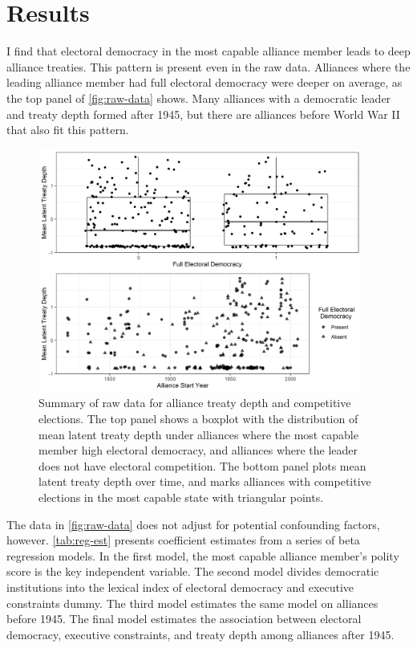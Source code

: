 \documentclass[12pt]{article}
\begin{document}
\section{Results}


I find that electoral democracy in the most capable alliance member leads to deep alliance treaties. 
This pattern is present even in the raw data. 
Alliances where the leading alliance member had full electoral democracy were deeper on average, as the top panel of \autoref{fig:raw-data} shows. 
Many alliances with a democratic leader and treaty depth formed after 1945, but there are alliances before World War II that also fit this pattern. 

\begin{figure}[hbtp]
\centering
\includegraphics[width=0.95\textwidth]{../figures/raw-data.png}
\caption{Summary of raw data for alliance treaty depth and competitive elections. The top panel shows a boxplot with the distribution of mean latent treaty depth under alliances where the most capable member high electoral democracy, and alliances where the leader does not have electoral competition. The bottom panel plots mean latent treaty depth over time, and marks alliances with competitive elections in the most capable state with triangular points. }
\label{fig:raw-data}
\end{figure}


The data in \autoref{fig:raw-data} does not adjust for potential confounding factors, however. 
\autoref{tab:reg-est} presents coefficient estimates from a series of beta regression models. 
In the first model, the most capable alliance member's polity score is the key independent variable. 
The second model divides democratic institutions into the lexical index of electoral democracy and executive constraints dummy.  
The third model estimates the same model on alliances before 1945. 
The final model estimates the association between electoral democracy, executive constraints, and treaty depth among alliances after 1945. 
\end{document}
